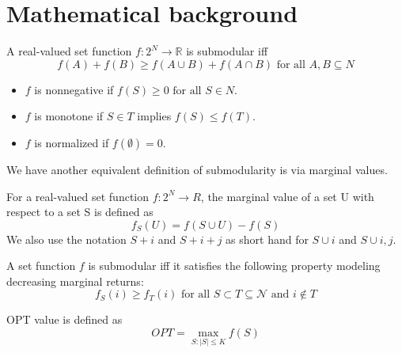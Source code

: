 \documentclass[11pt, a4paper]{article}
\begin{document}
\section{Mathematical background}
\begin{definition}
A real-valued set function $f: 2^{N} \rightarrow  \mathbb{R}$ is submodular iff
\begin{equation}
   f(A)+f(B) \geq f(A \cup B)+f(A \cap B)\text{ for all }  A, B \subseteq N  
\end{equation}
\begin{itemize}
    \item $f$ is nonnegative if $f(S) \geq 0 \text{ for all } S \in N.$
    \item  $f$ is monotone if $S \in T$ implies $f(S) \leq f(T).$
    \item  $f$ is normalized if $f(\emptyset) = 0.$
\end{itemize}

\end{definition}

We have another equivalent definition of submodularity is via marginal values. 
 
\begin{definition}
For a real-valued set function $f : 2^N \rightarrow R$, the marginal value of a set U with respect to a set S is defined as
\begin{equation}
    f_{S}(U) = f(S \cup U)-f(S)
\end{equation}
We also use the notation $S + i$ and $S + i + j$ as short hand for $S \cup {i}$ and $S \cup {i, j}.$ 
\end{definition}

\begin{definition}
A set function $f$ is submodular iff it satisfies the following property modeling decreasing marginal returns:
\begin{equation}
f_{S}(i) \geq f_{T}(i) \text { for all } S \subset T \subseteq \mathcal{N} \text { and } i \notin T
\end{equation}

\end{definition}
\begin{definition}
OPT value is defined as
\begin{equation}
  O P T=\max _{S:|S| \leq K} f(S)  
\end{equation}


\end{definition}
\end{document}
